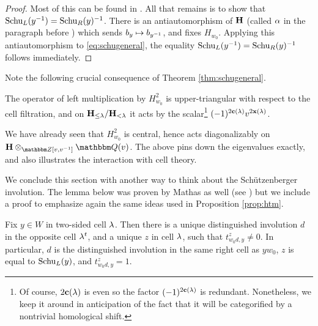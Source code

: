 \begin{proof} Most of this can be found in \cite[Proposition 3.9]{Mathas96}. All that remains is to show that $\operatorname{Schu}_L(y^{-1}) = \operatorname{Schu}_R(y)^{-1}$. There is an antiautomorphism of ${\mathbf H}$
(called $\alpha$ in the paragraph before \cite[Proposition 3.9]{Mathas96}) which sends $b_y \mapsto b_{y^{-1}}$, and fixes $H_{w_0}$. Applying this antiautomorphism to \eqref{eq:schugeneral},
the equality $\operatorname{Schu}_L(y^{-1}) = \operatorname{Schu}_R(y)^{-1}$ follows immediately. \end{proof}

Note the following crucial consequence of Theorem \ref{thm:schugeneral}.

\begin{cor}\label{cor:ftUpperTriangDecat} The operator of left multiplication by $H_{w_0}^2$ is upper-triangular with respect to the cell filtration, and on ${\mathbf H}_{\le \lambda}/{\mathbf H}_{< \lambda}$ it acts by the scalar\footnote{Of course, $2\mathbf{c}(\lambda)$ is even so the factor $(-1)^{2\mathbf{c}(\lambda)}$ is redundant. Nonetheless, we keep it around in anticipation of the fact that it will be categorified by a nontrivial homological shift.} $(-1)^{2\mathbf{c}(\lambda)} v^{2\mathbf{x}(\lambda)}$. \end{cor}

We have already seen that $H_{w_0}^2$ is central, hence acts diagonalizably on $\HB\otimes_{\Z[v,v\inv]}\Q(v)$.  The above pins down the eigenvalues exactly, and also illustrates the interaction with cell theory.

We conclude this section with another way to think about the Sch\"utzenberger involution. The lemma below was proven by Mathas as well (see \cite[Theorem 3.1]{Mathas96}) but we include a proof to emphasize again the same ideas used in Proposition \ref{prop:htm}.

\begin{lemma} \label{lem:schuvstwist} Fix $y \in W$ in two-sided cell $\lambda$. Then there is a unique distinguished involution $d$ in the opposite cell $\lambda^t$, and a unique $z$ in cell
$\lambda$, such that $t_{w_0 d, y}^z \ne 0$. In particular, $d$ is the distinguished involution in the same right cell as $y w_0$, $z$ is equal to $\operatorname{Schu}_L(y)$, and $t_{w_0 d, y}^z = 1$.
\end{lemma}

